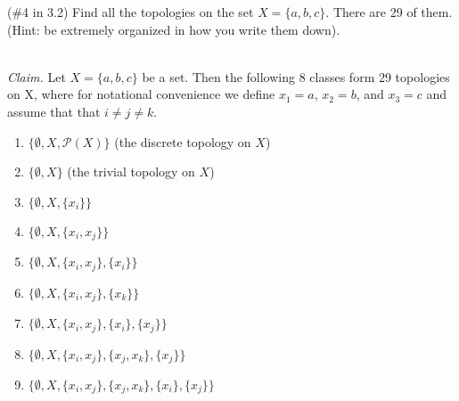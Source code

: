 (\#4 in 3.2) Find all the topologies on the set $X = \{a,b,c\}$. There are 29 of them. (Hint: be extremely organized in how you write them down). 

\ \\
\emph{Claim.} Let $X = \{a, b, c\}$ be a set. Then the following 8 classes form 29 topologies on X, where for 
              notational convenience we define $x_1 = a$, $x_2 = b$, and $x_3 = c$ and assume that 
              that $i \neq j \neq k$.

\begin{enumerate}
    \item $\{\emptyset, X, \mathcal{P}(X)\}$ (the discrete topology on $X$)
    \item $\{\emptyset, X\}$ (the trivial topology on $X$)
    \item $\{\emptyset, X, \{x_i\}\}$
    \item $\{\emptyset, X, \{x_i, x_j\}\}$
    \item $\{\emptyset, X, \{x_i, x_j\}, \{x_i\}\}$
    \item $\{\emptyset, X, \{x_i, x_j\}, \{x_k\}\}$
    \item $\{\emptyset, X, \{x_i, x_j\}, \{x_i\}, \{x_j\}\}$
    \item $\{\emptyset, X, \{x_i, x_j\}, \{x_j, x_k\}, \{x_j\}\}$
    \item $\{\emptyset, X, \{x_i, x_j\}, \{x_j, x_k\}, \{x_i\}, \{x_j\}\}$
\end{enumerate}

